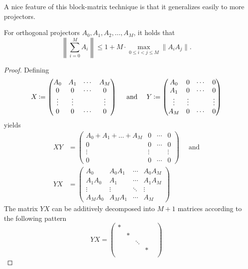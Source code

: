 A nice feature of this block-matrix technique is that it generalizes
easily to more projectors.
\begin{proposition} \label{prop:morebases}
For orthogonal projectors $A_0, A_1, A_2, \ldots, A_M$, it holds that 
\begin{equation} \label{eq:multiproj} 
\left\| \sum_{i=0}^M A_i \right\| \leq 1 + M \cdot \max_{0\leq i< j
  \leq M}
\|A_iA_j\|.
\end{equation}
\end{proposition}
\begin{proof}
Defining
\[
X \assign \begin{pmatrix} A_0 & A_1 & \cdots & A_M
    \\ 0 & 0 & \cdots & 0 \\ \vdots & \vdots& & \vdots \\ 0 & 0 &
    \cdots & 0\end{pmatrix}
\quad \mbox{ and } \quad
Y \assign \begin{pmatrix} A_0 & 0 & \cdots & 0 \\
    A_1 & 0 & \cdots & 0 \\  \vdots & \vdots& & \vdots \\ A_M & 0 & \cdots & 0 \end{pmatrix}
\]
yields
\begin{align*}
XY &= \begin{pmatrix} A_0 +A_1 + \ldots + A_M & 0 & \cdots & 0
    \\ 0 & 0 & \cdots & 0 \\ \vdots & \vdots& & \vdots \\ 0 & 0 &
    \cdots & 0\end{pmatrix} \quad \mbox{ and}\\
YX &= \begin{pmatrix} A_0 & A_0 A_1 & \cdots &
    A_0 A_M \\  A_1 A_0 & A_1 & \cdots & A_1 A_M \\  \vdots & \vdots&
    \ddots& \vdots \\ A_M A_0 & A_M A_1 & \cdots & A_M \end{pmatrix}
\end{align*}
The matrix $YX$ can be additively decomposed into $M+1$ matrices
according to the following pattern
\[
YX= \begin{pmatrix} * &  &  &
     & \\   & * & &  &   \\   &  & \ddots & &  \\  &  & & * &  \\

\end{pmatrix}\]
\end{proof}
